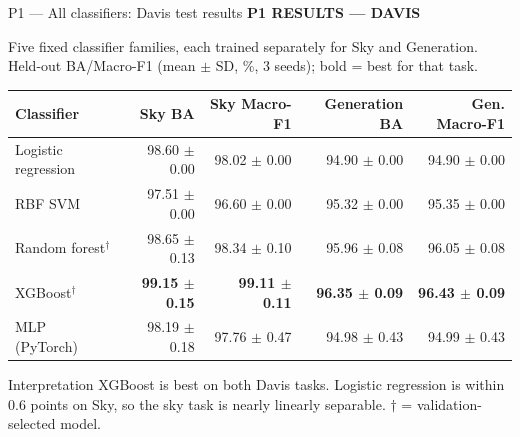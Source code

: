 \documentclass[aspectratio=169,11pt]{beamer}
\newcommand{\sectiontag}[1]{{\footnotesize\usebeamercolor[fg]{structure}\textbf{#1}}\par\vspace{0.10cm}}
\newcommand{\smallmuted}[1]{{\footnotesize\color{slate}#1\par}}
\begin{document}
\begin{frame}{P1 — All classifiers: Davis test results}
\sectiontag{P1 \quad RESULTS — DAVIS}
\smallmuted{Five fixed classifier families, each trained separately for Sky and Generation. Held-out BA/Macro-F1 (mean $\pm$ SD, \%, 3 seeds); bold = best for that task.}
\vspace{0.14cm}
{\scriptsize
\setlength{\tabcolsep}{5.2pt}
\renewcommand{\arraystretch}{1.55}
\begin{tabular}{@{}lrrrr@{}}\toprule
\textbf{Classifier} & \textbf{Sky BA} & \textbf{Sky Macro-F1} & \textbf{Generation BA} & \textbf{Gen. Macro-F1}\\\midrule
Logistic regression & 98.60 $\pm$ 0.00 & 98.02 $\pm$ 0.00 & 94.90 $\pm$ 0.00 & 94.90 $\pm$ 0.00\\
RBF SVM & 97.51 $\pm$ 0.00 & 96.60 $\pm$ 0.00 & 95.32 $\pm$ 0.00 & 95.35 $\pm$ 0.00\\
Random forest$^{\dagger}$ & 98.65 $\pm$ 0.13 & 98.34 $\pm$ 0.10 & 95.96 $\pm$ 0.08 & 96.05 $\pm$ 0.08\\
\rowcolor{softteal} XGBoost$^{\dagger}$ & \textbf{99.15 $\pm$ 0.15} & \textbf{99.11 $\pm$ 0.11} & \textbf{96.35 $\pm$ 0.09} & \textbf{96.43 $\pm$ 0.09}\\
MLP (PyTorch) & 98.19 $\pm$ 0.18 & 97.76 $\pm$ 0.47 & 94.98 $\pm$ 0.43 & 94.99 $\pm$ 0.43\\
\bottomrule\end{tabular}
}
\vspace{0.18cm}
\begin{block}{Interpretation}
\small XGBoost is best on both Davis tasks. Logistic regression is within 0.6 points on Sky, so the sky task is nearly linearly separable. $\dagger$ = validation-selected model.
\end{block}
\end{frame}
\end{document}
